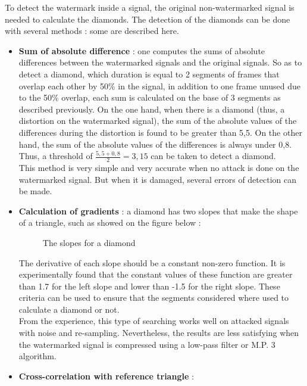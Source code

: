 To detect the watermark inside a signal, the original non-watermarked signal is needed to calculate the diamonds. The detection of the diamonds can be done with several methods : some are described here.\\
\begin{itemize}
\item \textbf{Sum of absolute difference} : one computes the sums of absolute differences between the watermarked signals and the original signals. So as to detect a diamond, which duration is equal to 2 segments of frames that overlap each other by 50\% in the signal, in addition to one frame unused due to the 50\% overlap, each sum is calculated on the base of 3 segments as described previously. On the one hand, when there is a diamond (thus, a distortion on the watermarked signal), the sum of the absolute values of the differences during the distortion is found to be greater than 5,5. On the other hand, the sum of the absolute values of the differences is always under 0,8. Thus, a threshold of $\frac{5,5 + 0,8}{2} = 3,15$ can be taken to detect a diamond.\\
This method is very simple and very accurate when no attack is done on the watermarked signal. But when it is damaged, several errors of detection can be made.
\item \textbf{Calculation of gradients} : a diamond has two slopes that make the shape of a triangle, such as showed on the figure below :
\begin{figure}[H]
\caption{\label{slopes} The slopes for a diamond}
\end{figure}
The derivative of each slope should be a constant non-zero function. It is experimentally found that the constant values of these function are greater than 1.7 for the left slope and lower than -1.5 for the right slope. These criteria can be used to ensure that the segments considered where used to calculate a diamond or not.\\
From the experience, this type of searching works well on attacked signals with noise and re-sampling. Nevertheless, the results are less satisfying when the watermarked signal is compressed using a low-pass filter or M.P. 3 algorithm.
\item \textbf{Cross-correlation with reference triangle} : 
\end{itemize}
